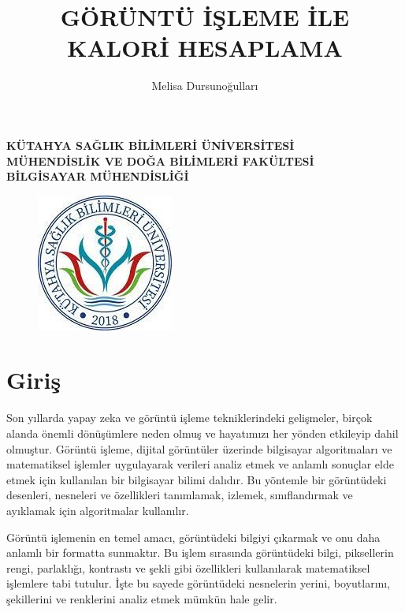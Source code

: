 \documentclass[11pt,a4paper]{report}
\title{GÖRÜNTÜ İŞLEME İLE KALORİ HESAPLAMA}
\author{Melisa Dursunoğulları}
\begin{document}
	\textbf{KÜTAHYA SAĞLIK BİLİMLERİ ÜNİVERSİTESİ}\\ \centering
	\textbf{MÜHENDİSLİK VE DOĞA BİLİMLERİ FAKÜLTESİ}\\ \centering
	\textbf{BİLGİSAYAR MÜHENDİSLİĞİ}\\ \centering
	\begin{figure}[!h]
		\centering
		\includegraphics{ksbu}
		\maketitle
	\end{figure}
	\newpage
	
	
	\raggedright
	\section{Giriş}
	Son yıllarda yapay zeka ve görüntü işleme tekniklerindeki gelişmeler, birçok alanda önemli dönüşümlere neden olmuş ve hayatımızı her yönden etkileyip dahil olmuştur. Görüntü işleme, dijital görüntüler üzerinde bilgisayar algoritmaları ve matematiksel işlemler uygulayarak verileri analiz etmek ve anlamlı sonuçlar elde etmek için kullanılan bir bilgisayar bilimi dalıdır. Bu yöntemle bir görüntüdeki desenleri, nesneleri ve özellikleri tanımlamak, izlemek, sınıflandırmak ve ayıklamak için algoritmalar kullanılır.
	
	Görüntü işlemenin en temel amacı, görüntüdeki bilgiyi çıkarmak ve onu daha anlamlı bir formatta sunmaktır. Bu işlem sırasında görüntüdeki bilgi, piksellerin rengi, parlaklığı, kontrastı ve şekli gibi özellikleri kullanılarak matematiksel işlemlere tabi tutulur. İşte bu sayede görüntüdeki nesnelerin yerini, boyutlarını, şekillerini ve renklerini analiz etmek mümkün hale gelir\cite{SOCARTürkiye}.
	\newline
	
\end{document}
